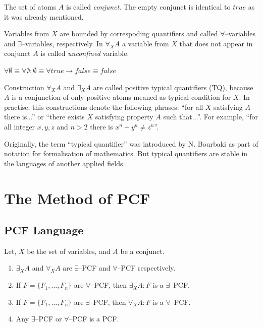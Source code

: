 \documentclass[runningheads,a4paper]{llncs}
\begin{document}
The set of atoms $A$ is called {\em conjunct}. The empty conjunct is identical to $true$ as it was already mentioned.

Variables from $X$ are bounded by correspoding quantifiers and called $\forall$--variables and $\exists$--variables, respectively. In $\forall_XA$ a variable from $X$ that does not appear in conjunct $A$ is called {\em unconfined} variable. 

$\forall \emptyset \equiv \forall \emptyset\colon\emptyset \equiv \forall true \rightarrow false \equiv false$

Construction $\forall_XA$ and $\exists_XA$ are called positive typical quantifiers (TQ), because $A$ is a conjunction of only positive atoms meaned as typical condition for $X$. In practise, this constructions denote the following phrases: ``for all $X$ satisfying $A$ there is...'' or ``there exists $X$ satisfying property $A$ such that...''. For example, ``for all integer $x,y,z$ and $n>2$ there is $x^n + y^n \ne z^n$''.

Originally, the term ``typical quantifier'' was introduced by N. Bourbaki \cite{Bourbaki} as part of notation for formalisation of mathematics. But typical quantifiers are stable in the languages of another applied fields.

\section{The Method of PCF}

\subsection{PCF Language}

\begin{definition}
\label{def:pcf}
Let, $X$ be the set of variables, and $A$ be a conjunct.
\begin{enumerate}

\item $\exists_XA$ and $\forall_XA$ are $\exists$--PCF and $\forall$--PCF respectively. 

\item If $F = \{F_1,\ldots,F_n\}$ are $\forall$--PCF, then $\exists_XA\colon F$ is a $\exists$--PCF.

\item If $F = \{F_1,\ldots,F_n\}$ are $\exists$--PCF, then $\forall_XA\colon F$ is a $\forall$--PCF.

\item Any $\exists$--PCF or $\forall$--PCF is a PCF.  
\end{enumerate}
\end{definition}
\end{document}
